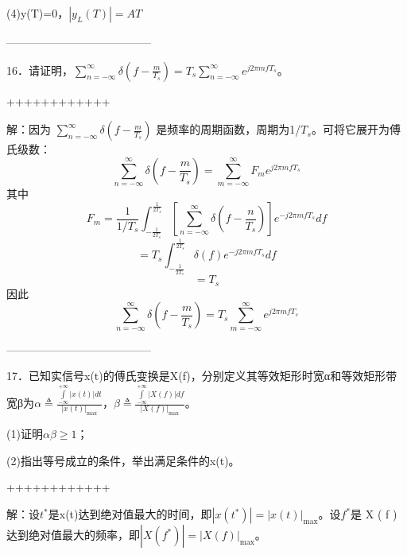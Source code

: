 \documentclass[utf8]{article}
\begin{document}
(4)y(T)=0，$\left|y_{L} \left( T \right) \right|=AT$

---------------------------------------

16．请证明，$\sum_{n=- \infty}^{ \infty} \delta \left( f- \frac{m}{T_{s}} \right)=T_{s} \sum_{n=- \infty}^{ \infty}e^{j2 \pi mfT_{s}}$。

++++++++++++

解：因为
$\sum_{n=- \infty}^{ \infty} \delta \left( f- \frac{m}{T_{s}} \right)$
是频率的周期函数，周期为1/$T_{s}$。可将它展开为傅氏级数： 
$$\sum_{n=- \infty}^{ \infty} \delta \left( f- \frac{m}{T_{s}} \right)= \sum_{m=- \infty}^{ \infty} F_{m}e^{j2 \pi mfT_{s}}$$
其中
$$F_{m}= \frac{1}{1/T_{s}} \int_{- \frac{1}{2T_{s}}}^{ \frac{1}{2T_{s}}} \left[ \sum_{n=- \infty}^{ \infty} \delta \left( f- \frac{n}{T_{s}} \right) \right] e^{-j2 \pi mfT_{s}}df$$
$$=T_{s} \int_{- \frac{1}{2T_{s}}}^{ \frac{1}{2T_{s}}} \delta \left( f \right) e^{-j2 \pi mfT_{s}}df$$
$$=T_{s}$$
因此
$$\sum_{n=- \infty}^{ \infty} \delta \left( f- \frac{m}{T_{s}} \right)=T_{s} \sum_{m=- \infty}^{ \infty}e^{j2 \pi mfT_{s}}$$

---------------------------------------

17．已知实信号x(t)的傅氏变换是X(f)，分别定义其等效矩形时宽α和等效矩形带宽β为$\alpha\triangleq\frac{\int\limits_{-\infty}^{+\infty}\left|x\left(t\right) \right|dt}{\left|x\left(t\right)\right|_{\max}}$，$\beta\triangleq\frac{\int\limits_{-\infty}^{+\infty}\left|X\left(f\right) \right|df}{\left|X\left(f\right)\right|_{\max}}$。

(1)证明$\alpha \beta \geq 1$； 

(2)指出等号成立的条件，举出满足条件的x(t)。

++++++++++++

解：设$t^{*}$是x(t)达到绝对值最大的时间，即$\left| x \left( t^{*} \right) \right|= \left| x \left( t \right) \right|_{ \max}$。设$f^{*}$是 X ( f ) 达到绝对值最大的频率，即$\left|X \left( f^{*} \right) \right|= \left|X \left( f \right) \right|_{ \max}$。
\end{document}
